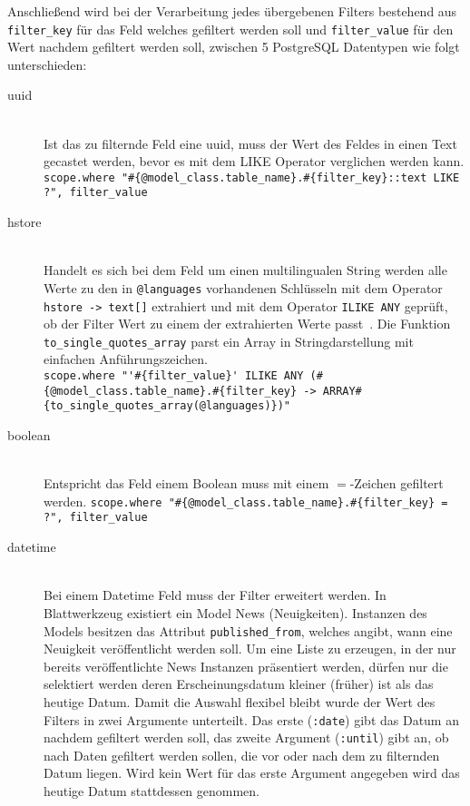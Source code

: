 Anschließend wird bei der Verarbeitung jedes übergebenen Filters bestehend aus \lstinline|filter_key| für das Feld welches gefiltert werden soll und \lstinline|filter_value| für den Wert nachdem gefiltert werden soll, zwischen 5 PostgreSQL Datentypen wie folgt unterschieden:
\begin{description}
	\item[uuid] \ \\
		Ist das zu filternde Feld eine uuid, muss der Wert des Feldes in einen Text gecastet werden, bevor es mit dem LIKE Operator verglichen werden kann. \\
		\lstinline|scope.where "#{@model_class.table_name}.#{filter_key}::text LIKE ?", filter_value|
	\item[hstore] \ \\
		Handelt es sich bei dem Feld um einen multilingualen String werden alle Werte zu den in \lstinline|@languages| vorhandenen Schlüsseln mit dem Operator \lstinline|hstore -> text[]| extrahiert und mit dem Operator \lstinline|ILIKE ANY| geprüft, ob der Filter Wert zu einem der extrahierten Werte passt~\cite{ilike-any-postgres}.
		Die Funktion \lstinline|to_single_quotes_array| parst ein Array in Stringdarstellung mit einfachen Anführungszeichen.\\
		\lstinline|scope.where "'#{filter_value}' ILIKE ANY (#{@model_class.table_name}.#{filter_key} -> ARRAY#{to_single_quotes_array(@languages)})"|
	\item[boolean] \ \\
		Entspricht das Feld einem Boolean muss mit einem $=$-Zeichen gefiltert werden.
		\lstinline|scope.where "#{@model_class.table_name}.#{filter_key} = ?", filter_value|
	\item[datetime] \ \\
		Bei einem Datetime Feld muss der Filter erweitert werden. In Blattwerkzeug existiert ein Model News (Neuigkeiten). Instanzen des Models besitzen das Attribut \lstinline|published_from|, welches angibt, wann eine Neuigkeit veröffentlicht werden soll. Um eine Liste zu erzeugen, in der nur bereits veröffentlichte News Instanzen präsentiert werden, dürfen nur die selektiert werden deren Erscheinungsdatum kleiner (früher) ist als das heutige Datum. Damit die Auswahl flexibel bleibt wurde der Wert des Filters in zwei Argumente unterteilt. Das erste (\lstinline|:date|) gibt das Datum an nachdem gefiltert werden soll, das zweite Argument (\lstinline|:until|) gibt an, ob nach Daten gefiltert werden sollen, die vor oder nach dem zu filternden Datum liegen. Wird kein Wert für das erste Argument angegeben wird das heutige Datum stattdessen genommen. \\

\end{description}
